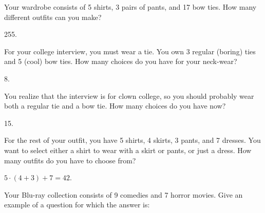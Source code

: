 \begin{questions}

\question Your wardrobe consists of 5 shirts, 3 pairs of pants, and 17 bow ties.  How many different outfits can you make?

  \begin{answer}
    255.
  \end{answer}


  
\question For your college interview, you must wear a tie.  You own 3 regular (boring) ties and 5 (cool) bow ties.  How many choices do you have for your neck-wear? 

  \begin{answer}
    8.
  \end{answer}




\question You realize that the interview is for clown college, so you should probably wear both a regular tie and a bow tie.  How many choices do you have now?

  \begin{answer}
    15.
  \end{answer}


\question For the rest of your outfit, you have 5 shirts, 4 skirts, 3 pants, and 7 dresses.  You want to select either a shirt to wear with a skirt or pants, or just a  dress.  How many outfits do you have to choose from?

	\begin{answer}
		$5\cdot (4+3) + 7 = 42$.
	\end{answer}




\question Your Blu-ray collection consists of 9 comedies and 7 horror movies. Give an example of a question for which the answer is:

  \begin{answer}
\end{answer}
\end{questions}
